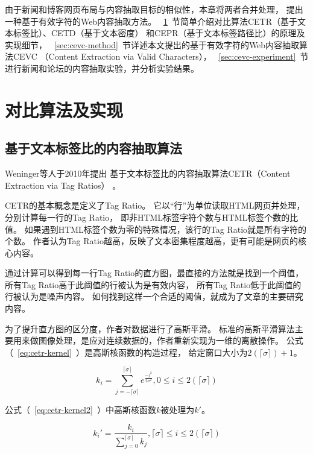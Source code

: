 由于新闻和博客网页布局与内容抽取目标的相似性，本章将两者合并处理，
提出一种基于有效字符的Web内容抽取方法。
~\ref{sec:cevc-other}~节简单介绍对比算法CETR（基于文本标签比）、CETD（基于文本密度）
和CEPR（基于文本标签路径比）的原理及实现细节，
~\ref{sec:cevc-method}~节详述本文提出的基于有效字符的Web内容抽取算法CEVC
（Content Extraction via Valid Characters），
~\ref{sec:cevc-experiment}~节进行新闻和论坛的内容抽取实验，并分析实验结果。

\section{对比算法及实现}
\label{sec:cevc-other}

\subsection{基于文本标签比的内容抽取算法}
Weninger等人于2010年提出
基于文本标签比的内容抽取算法CETR（Content Extraction via Tag Ratios）
。

CETR的基本概念是定义了Tag Ratio。
它以“行”为单位读取HTML网页并处理，分别计算每一行的Tag Ratio，
即非HTML标签字符个数与HTML标签个数的比值。
如果遇到HTML标签个数为零的特殊情况，该行的Tag Ratio就是所有字符的个数。
作者认为Tag Ratio越高，反映了文本密集程度越高，更有可能是网页的核心内容。

通过计算可以得到每一行Tag Ratio的直方图，最直接的方法就是找到一个阈值，
所有Tag Ratio高于此阈值的行被认为是有效内容，
所有Tag Ratio低于此阈值的行被认为是噪声内容。
如何找到这样一个合适的阈值，就成为了文章的主要研究内容。

为了提升直方图的区分度，作者对数据进行了高斯平滑。
标准的高斯平滑算法主要用来做图像处理，是应对连续数据的，作者重新实现为一维的离散操作。
公式（~\ref{eq:cetr-kernel}~）是高斯核函数的构造过程，
给定窗口大小为$2(\lceil \sigma \rceil) + 1$。

\begin{equation}
\label{eq:cetr-kernel}
k_i = \sum_{j=-\lceil \sigma \rceil}^{\lceil \sigma \rceil}
e^{\frac{-j^2}{2\sigma^2}}, 0 \leq i \leq 2(\lceil \sigma \rceil)
\end{equation}

公式（~\ref{eq:cetr-kernel2}~）中高斯核函数$k$被处理为$k'$。

\begin{equation}
\label{eq:cetr-kernel2}
k_i' = \frac{k_i}{\sum_{j=0}^{\lceil \sigma \rceil}k_j},
\lceil \sigma \rceil \leq i \leq 2(\lceil \sigma \rceil)
\end{equation}

